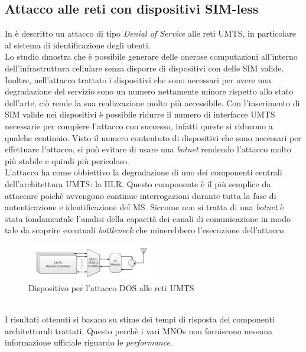 \subsection{Attacco alle reti con dispositivi SIM-less}
\cite{gsm-dos-simless}
In \cite{umts-dos} è descritto un attacco di tipo \textit{Denial of Service} alle reti UMTS, in particolare al
sistema di identificazione degli utenti. \\
Lo studio dmostra che è possibile generare delle onerose computazioni all'interno dell'infrastruttura cellulare senza 
disporre di dispositivi con delle SIM valide. Inoltre, nell'attacco trattato i dispositivi che sono necessari per avere una 
degradazione del servizio sono un numero nettamente minore rispetto allo stato dell'arte, ciò rende la sua realizzazione molto
più accessibile. Con l'inserimento di SIM valide nei dispositivi è possibile ridurre il numero di interfacce UMTS necessarie per compiere 
l'attacco con successo, infatti queste si riducono a qualche centinaio.
Visto il numero contentuto di dispositivi che sono necessari per effettuare l'attacco, si può evitare di usare una \textit{botnet} rendendo l'attacco
molto più stabile e quindi più pericoloso.\\
L'attacco ha come obbiettivo la degradazione di uno dei componenti centrali dell'architettura UMTS: la HLR. Questo componente è il più semplice da 
attaccare poichè avvengono continue interrogazioni durante tutta la fase di autenticazione e identificazione del MS.
Siccome non si tratta di una \textit{botnet} è stata fondamentale l'analisi della capacità dei canali di comunicazione in modo tale da scoprire eventuali
\textit{bottleneck} che minerebbero l'esecuzione dell'attacco.
\begin{figure}[h]
    \centering
    \includegraphics[width=0.5\textwidth]{images/umts-dos-device.png}
    \caption{Dispositivo per l'attacco DOS alle reti UMTS\cite{umts-dos}}
\end{figure}\\
I risultati ottenuti si basano su stime dei tempi di risposta dei componenti architetturali trattati. Questo perchè i vari MNOs non forniscono nessuna 
informazione ufficiale riguardo le \textit{performance}.